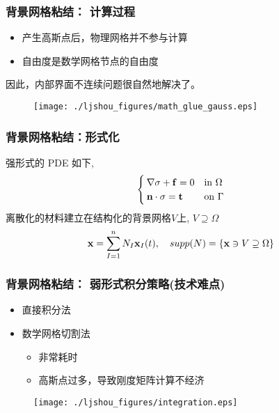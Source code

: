 \documentclass[mathserif]{beamer}
\begin{document}
\begin{CJK}{UTF8}{gkai}
		\begin{frame}
			\frametitle{背景网格粘结： 计算过程}
			\begin{itemize}
				\item 产生高斯点后，物理网格并不参与计算
				\item 自由度是数学网格节点的自由度
			\end{itemize}
			因此，内部界面不连续问题很自然地解决了。
				\begin{figure}
					\centering
					\texttt{[image: ./ljshou\_figures/math\_glue\_gauss.eps]}
			\end{figure}
		\end{frame}
		
		\begin{frame}
			\frametitle{背景网格粘结：形式化}
			强形式的 PDE 如下,
			\begin{equation}
				\begin{cases}
					\nabla {\bf \sigma} + {\bf f} = 0& \text{in }\Omega\\
					{\bf n}\cdot{\bf \sigma} = {\bf t}& \text{on }\Gamma
				\end{cases}
			\end{equation}
			离散化的材料建立在结构化的背景网格$V$上, $V \supseteq \Omega$
				\begin{equation}
					{\bf x} = \sum_{I=1}^{n}N_I{\bf x}_I(t), \quad supp(N) = \{{\bf x} \ni V \supseteq \Omega\}
				\end{equation}
		\end{frame}

		\begin{frame}
			\frametitle{背景网格粘结： 弱形式积分策略(技术难点)}
			\begin{itemize}
				\item 直接积分法
				\item 数学网格切割法
				\begin{itemize}
					\item 非常耗时
					\item 高斯点过多，导致刚度矩阵计算不经济
				\end{itemize}
			\end{itemize}
			\begin{figure}
					\centering
					\texttt{[image: ./ljshou\_figures/integration.eps]}
			\end{figure}
		\end{frame}
		

\end{CJK}
\end{document}
